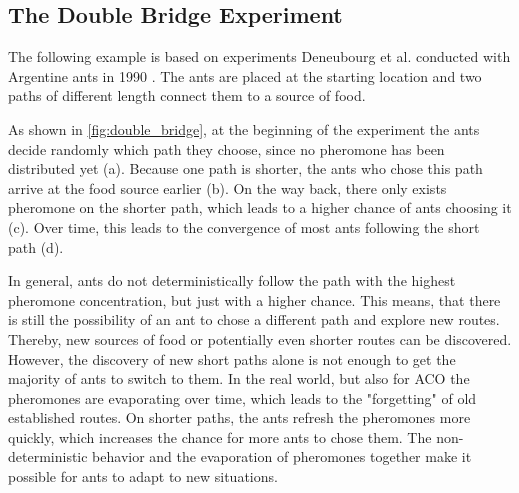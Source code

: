 \subsection{The Double Bridge Experiment}

The following example is based on experiments Deneubourg et al. conducted with Argentine ants in 1990 \cite{deneubourg1990self}. The ants are placed at the starting location and two paths of different length connect them to a source of food.

As shown in \ref{fig:double_bridge}, at the beginning of the experiment the ants decide randomly which path they choose, since no pheromone has been distributed yet (a). Because one path is shorter, the ants who chose this path arrive at the food source earlier (b). On the way back, there only exists pheromone on the shorter path, which leads to a higher chance of ants choosing it (c). Over time, this leads to the convergence of most ants following the short path (d).

In general, ants do not deterministically follow the path with the highest pheromone concentration, but just with a higher chance. This means, that there is still the possibility of an ant to chose a different path and explore new routes. Thereby, new sources of food or potentially even shorter routes can be discovered. However, the discovery of new short paths alone is not enough to get the majority of ants to switch to them. In the real world, but also for ACO the pheromones are evaporating over time, which leads to the "forgetting" of old established routes. On shorter paths, the ants refresh the pheromones more quickly, which increases the chance for more ants to chose them. The non-deterministic behavior and the evaporation of pheromones together make it possible for ants to adapt to new situations.

